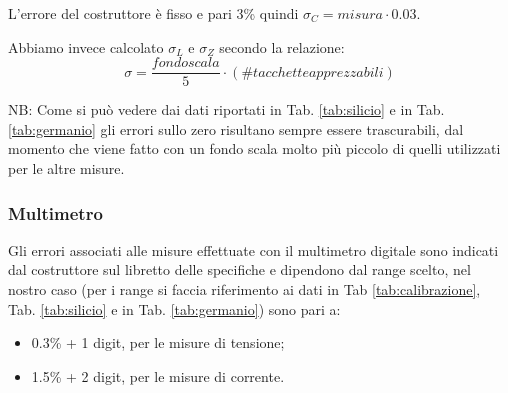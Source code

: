 \documentclass[a4paper, 11pt]{article}
\begin{document}
L'errore del costruttore è fisso e pari 3\% quindi $\sigma_C = misura \cdot 0.03$.

Abbiamo invece calcolato $\sigma_L$ e $\sigma_Z$ secondo la relazione: 
\begin{equation*}
    \sigma = \frac{fondo scala}{5} \cdot ( \# tacchette apprezzabili)
\end{equation*}

NB: Come si può vedere dai dati riportati in Tab. \ref{tab:silicio} e in Tab. \ref{tab:germanio} gli errori sullo zero risultano sempre essere trascurabili, dal momento che viene fatto con un fondo scala molto più piccolo di quelli utilizzati per le altre misure.

\subsubsection{Multimetro}
Gli errori associati alle misure effettuate con il multimetro digitale sono indicati dal costruttore sul libretto delle specifiche e dipendono dal range scelto, nel nostro caso (per i range si faccia riferimento ai dati in Tab \ref{tab:calibrazione}, Tab. \ref{tab:silicio} e in Tab. \ref{tab:germanio}) sono pari a:
\begin{itemize}
    \item 0.3\% + 1 digit, per le misure di tensione;
    \item 1.5\% + 2 digit, per le misure di corrente.
\end{itemize}
\end{document}
